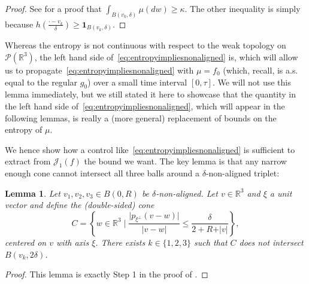 \documentclass[11pt,a4paper]{article}
\theoremstyle{definition}
\theoremstyle{plain}
\newtheorem{lemma}[defi]{Lemma}
\begin{document}
\begin{proof}
    See \cite{FournierHauray2015} for a proof that $\int_{B(v_k,\delta)}\mu(dw) \geq \kappa$. The other inequality is simply because $h\left(\frac{\cdot-v_k}{\delta}\right)\geq \mathbf{1}_{B(v_k,\delta)}$.
\end{proof}
Whereas the entropy is not continuous with respect to the weak topology on $\mathcal{P}(\mathbb{R}^3)$, the left hand side of~\eqref{eq:entropyimpliesnonaligned} is, which will allow us to propagate~\eqref{eq:entropyimpliesnonaligned} with $\mu=f_0$ (which, recall, is a.s. equal to the regular $g_0$) over a small time interval $[0,\tau]$. We will not use this lemma immediately, but we still stated it here to showcase that the quantity in the left hand side of~\eqref{eq:entropyimpliesnonaligned}, which will appear in the following lemmas, is really a (more general) replacement of bounds on the entropy of $\mu$.

We hence show how a control like~\eqref{eq:entropyimpliesnonaligned} is sufficient to extract from $\mathcal{J}_1(f)$ the bound we want.
The key lemma is that any narrow enough cone cannot intersect all three balls around a $\delta$-non-aligned triplet:
\begin{lemma}\cite[adapted from Lemma 6.2]{FournierHauray2015}
    \label{lem:conenonaligned}
    Let $v_1,v_2,v_3\in B(0,R)$ be $\delta$-non-aligned.
    Let $v\in\mathbb{R}^3$ and $\xi$ a unit vector and define the (double-sided) cone
    $$C=\left\{ w\in \mathbb{R}^3 \;\bigg\vert\; \frac{\vert p_{\xi^\perp}(v-w)\vert}{\vert v-w\vert} \leq \frac{\delta}{2+R+\vert v\vert} \right\},$$
    centered on $v$ with axis $\xi$. There exists $k\in\{1,2,3\}$ such that $C$ does not intersect $B(v_k,2\delta)$.
\end{lemma}
\begin{proof}
    This lemma is exactly Step 1 in the proof of \cite[ Lemma 6.2]{FournierHauray2015}.
\end{proof}
\end{document}
